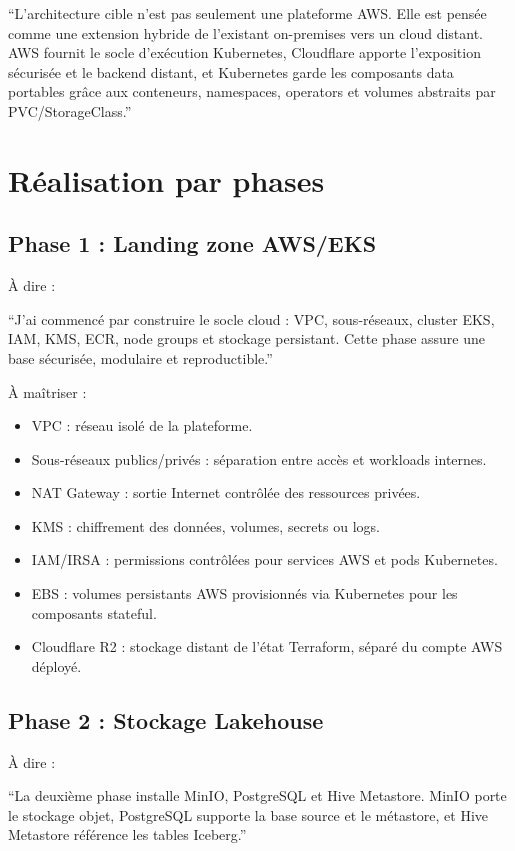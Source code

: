 \documentclass[11pt,a4paper]{article}
\newcommand{\important}[1]{%
  \vspace{0.25cm}
  \noindent
  \colorbox{softblue}{%
    \parbox{\dimexpr\textwidth-2\fboxsep\relax}{#1}%
  }
  \vspace{0.2cm}
}
\begin{document}
\important{
``L'architecture cible n'est pas seulement une plateforme AWS. Elle est pensée comme une extension hybride de l'existant on-premises vers un cloud distant. AWS fournit le socle d'exécution Kubernetes, Cloudflare apporte l'exposition sécurisée et le backend distant, et Kubernetes garde les composants data portables grâce aux conteneurs, namespaces, operators et volumes abstraits par PVC/StorageClass.''
}

\section{Réalisation par phases}

\subsection{Phase 1 : Landing zone AWS/EKS}

À dire :

\important{
``J'ai commencé par construire le socle cloud : VPC, sous-réseaux, cluster EKS, IAM, KMS, ECR, node groups et stockage persistant. Cette phase assure une base sécurisée, modulaire et reproductible.''
}

À maîtriser :
\begin{itemize}
  \item VPC : réseau isolé de la plateforme.
  \item Sous-réseaux publics/privés : séparation entre accès et workloads internes.
  \item NAT Gateway : sortie Internet contrôlée des ressources privées.
  \item KMS : chiffrement des données, volumes, secrets ou logs.
  \item IAM/IRSA : permissions contrôlées pour services AWS et pods Kubernetes.
  \item EBS : volumes persistants AWS provisionnés via Kubernetes pour les composants stateful.
  \item Cloudflare R2 : stockage distant de l'état Terraform, séparé du compte AWS déployé.
\end{itemize}

\subsection{Phase 2 : Stockage Lakehouse}

À dire :

\important{
``La deuxième phase installe MinIO, PostgreSQL et Hive Metastore. MinIO porte le stockage objet, PostgreSQL supporte la base source et le métastore, et Hive Metastore référence les tables Iceberg.''
}
\end{document}
